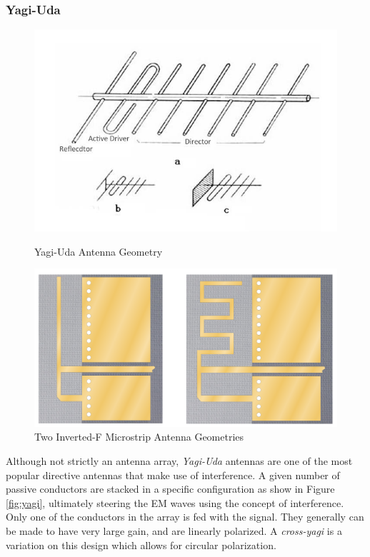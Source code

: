\subsubsection{Yagi-Uda}
\begin{figure}[!htb]
  \begin{minipage}{.49\textwidth}
    \centering
    \includegraphics[width=0.8\linewidth]{yagi}
    \caption{Yagi-Uda Antenna Geometry \cite{site-icantennasYagi}}
    \label{fig:yagi}
  \end{minipage}
  \begin{minipage}{.49\textwidth}
    \centering
    \includegraphics[width=0.8\linewidth]{invertedF}
    \caption{Two Inverted-F Microstrip Antenna Geometries \cite{site-invertedFAntenna}}
    \label{fig:invertedF}
  \end{minipage}
\end{figure}

Although not strictly an antenna array, \textit{Yagi-Uda} antennas are one of the most popular directive antennas that make use of interference. A given number of passive conductors are stacked in a specific configuration as show in Figure \ref{fig:yagi}, ultimately steering the EM waves using the concept of interference. Only one of the conductors in the array is fed with the signal. They generally can be made to have very large gain, and are linearly polarized. A \textit{cross-yagi} is a variation on this design which allows for circular polarization.

